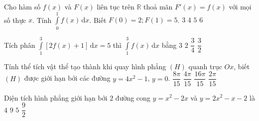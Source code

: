 \begin{ex}%
	Cho hàm số $f(x)$ và $F(x)$ liên tục trên $\mathbb{R}$ thoả mãn $F'(x)=f(x)$ với mọi số thực $x$. Tính $\displaystyle \int\limits_0^1 f(x)\mathrm{\,d}x$. Biết $F(0)=2; F(1)=5$.
	\choice
	{\True $3$}
	{$4$}
	{$5$}
	{$6$}
\end{ex}
\begin{ex}%
	Tích phân $\displaystyle\int\limits_{1}^{3}\left[2f(x)+1\right]\mathrm{\,d}x=5$ thì $\displaystyle\int\limits_{1}^{3} f(x)\mathrm{\,d}x$ bằng
	\choice
	{$3$}
	{$2$}
	{$\dfrac{3}{4}$}
	{\True$\dfrac{3}{2}$}
\end{ex}
\begin{ex}%
	Tính thể tích vật thể tạo thành khi quay hình phẳng $(H)$ quanh trục $Ox$, biết $(H)$ được giới hạn bởi các đường $y=4x^2-1$, $y=0$.
	\choice
	{\True $\dfrac{8\pi}{15}$}
	{$\dfrac{4\pi}{15}$}
	{$\dfrac{16\pi}{15}$}
	{$\dfrac{2\pi}{15}$}
\end{ex}
\begin{ex}%
	Diện tích hình phẳng giới hạn bởi $2$ đường cong $y = x^2 - 2x$ và $y = 2x^2 - x - 2$ là
	\choice
	{$4$}
	{$9$}
	{$5$}
	{\True $\dfrac{9}{2}$}
\end{ex}
